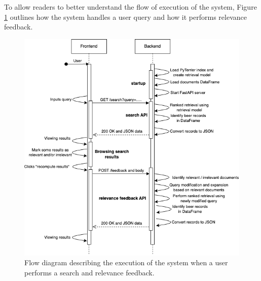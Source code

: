 To allow readers to better understand the flow of execution of the system, Figure \ref{fig:flow-diagram} outlines how the system handles a user query and how it performs relevance feedback.

\begin{figure}[H]
  \centering
  \includegraphics[width=1\textwidth]{img/3_implementation/search-flow.png}
  \caption{Flow diagram describing the execution of the system when a user performs a search and relevance feedback.}
  \label{fig:flow-diagram}
\end{figure}
\newpage
